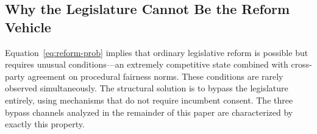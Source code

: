 \subsection{Why the Legislature Cannot Be the Reform Vehicle}

Equation~\eqref{eq:reform-prob} implies that ordinary legislative reform is possible but requires unusual conditions---an extremely competitive state combined with cross-party agreement on procedural fairness norms. These conditions are rarely observed simultaneously. The structural solution is to bypass the legislature entirely, using mechanisms that do not require incumbent consent. The three bypass channels analyzed in the remainder of this paper are characterized by exactly this property.
